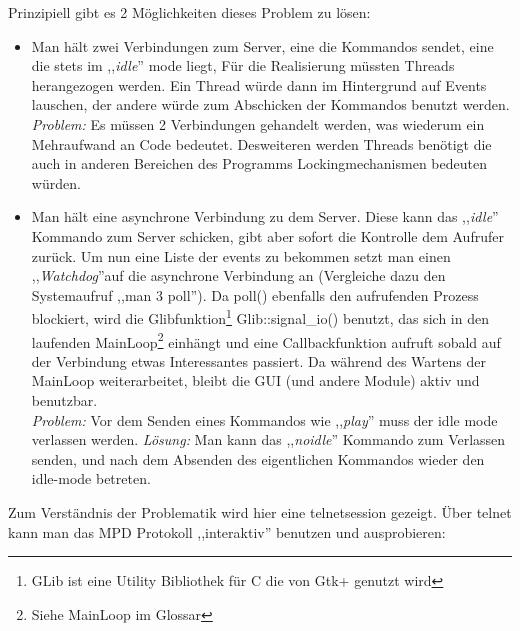 Prinzipiell gibt es 2 Möglichkeiten dieses Problem zu lösen:
\begin{itemize}
    \item Man hält zwei Verbindungen zum Server, eine die Kommandos sendet, eine die stets im ,,\textit{idle}'' mode liegt,
        Für die Realisierung müssten Threads herangezogen werden. Ein Thread würde dann im Hintergrund auf Events lauschen,
        der andere würde zum Abschicken der Kommandos benutzt werden.
        \emph{Problem:} Es müssen 2 Verbindungen gehandelt werden, was wiederum ein Mehraufwand an Code bedeutet.
        Desweiteren werden Threads benötigt die auch in anderen Bereichen des Programms Lockingmechanismen bedeuten würden.
    \item Man hält eine asynchrone Verbindung zu dem Server.
        Diese kann das ,,\textit{idle}'' Kommando zum Server schicken, gibt aber sofort die Kontrolle dem Aufrufer zurück. Um nun eine Liste der events zu bekommen setzt man 
        einen ,,\textit{Watchdog}''auf die asynchrone Verbindung an (Vergleiche dazu den Systemaufruf ,,man 3 poll'').
        Da poll() ebenfalls den aufrufenden Prozess blockiert, wird die Glibfunktion\footnote{GLib ist eine Utility Bibliothek für C die von Gtk+ genutzt wird} Glib::signal\_io() benutzt, das sich in den laufenden MainLoop\footnote{Siehe MainLoop im Glossar} einhängt und eine 
        Callbackfunktion aufruft sobald auf der Verbindung etwas Interessantes passiert. Da während des Wartens der MainLoop
        weiterarbeitet, bleibt die GUI (und andere Module) aktiv und benutzbar.
        \\
        \emph{Problem:} Vor dem Senden eines Kommandos wie ,,\textit{play}'' muss der idle mode verlassen werden.
        \emph{Lösung:} Man kann das ,,\textit{noidle}'' Kommando zum Verlassen senden, und nach dem Absenden des eigentlichen Kommandos wieder den idle-mode betreten.
\end{itemize}

Zum Verständnis der Problematik wird hier eine telnetsession gezeigt. 
Über telnet kann man das MPD Protokoll ,,interaktiv'' benutzen und ausprobieren: 


